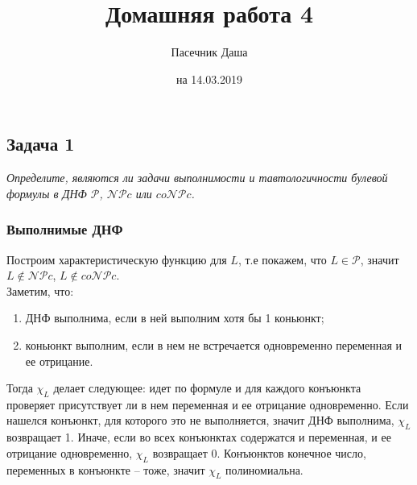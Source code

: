 \documentclass{article}
\title{Домашняя работа 4}
\author{Пасечник Даша}
\date{на 14.03.2019}
\begin{document}
\maketitle

\subsection*{Задача 1}
\textit{Определите, являются ли задачи выполнимости и тавтологичности булевой формулы в ДНФ $\mathcal{P}$, $ \mathcal{NP}c$ или $co\mathcal{NP}c$.}

\subsubsection*{Выполнимые ДНФ}
Построим характеристическую функцию для $L$, т.е покажем, что $L \in \mathcal{P}$, значит $L \notin \mathcal{NP}c$, $L \notin co\mathcal{NP}c$.\\
Заметим, что: 
\begin{enumerate}
	\item ДНФ выполнима, если в ней выполним хотя бы 1 коньюнкт;
	\item коньюнкт выполним, если в нем не встречается одновременно переменная и ее отрицание.
\end{enumerate}
Тогда $\chi_L$ делает следующее: идет по формуле и для каждого конъюнкта проверяет присутствует ли в нем переменная и ее отрицание одновременно. Если нашелся конъюнкт, для которого это не выполняется, значит ДНФ выполнима, $\chi_L$ возвращает 1. Иначе, если во всех конъюнктах содержатся и переменная, и ее отрицание одновременно, $\chi_L$ возвращает 0. Конъюнктов конечное число, переменных в конъюнкте -- тоже, значит $\chi_L$ полиномиальна.
\end{document}
